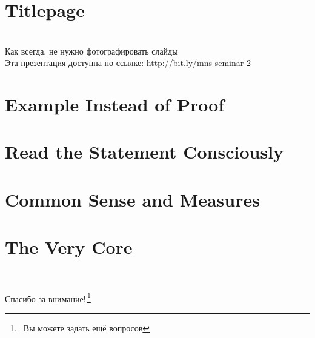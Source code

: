 \documentclass[aspectratio=1610,12pt]{beamer}
\begin{document}
\renewcommand{\thefootnote}{/*\!/}
\section[•]{Titlepage}
\begin{frame}\titlepage\end{frame}

\begin{frame} \begin{center}
	{\small\ } \\ [0.7cm]
	{\Large Как всегда, не нужно фотографировать слайды} \\ [0.9cm]
	{\small Эта презентация доступна по ссылке: \url{http://bit.ly/mns-seminar-2}}
\end{center} \end{frame}

\section[Доказательство?]{Example Instead of Proof}


\section[Условие?]{Read the Statement Consciously}


\section[Размерности]{Common Sense and Measures}


\section[Суть?]{The Very Core}




\renewcommand{\thefootnote}{/*\!/}
\begin{frame}
	\ \\
	\centerline{\huge Спасибо за внимание!\,\footnote{\ Вы можете задать ещё вопросов}}
\end{frame}
\end{document}

